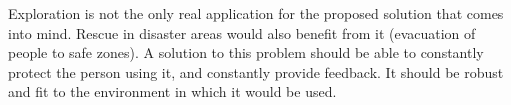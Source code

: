 \documentclass[oneside, a4paper, 12pt]{memoir}
\begin{document}
	Exploration is not the only real application for the proposed solution that comes into mind. Rescue in disaster areas would also benefit from it (evacuation of people to safe zones). A solution to this problem should be able to constantly protect the person using it, and constantly provide feedback. It should be robust and fit to the environment in which it would be used.
	
%			
%			
%			
	
\end{document}
